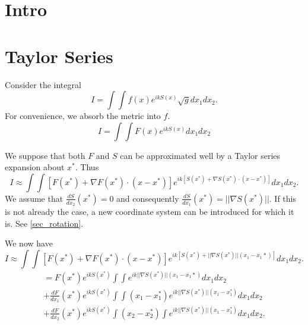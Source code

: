 \documentclass{article}
\newcommand{\norm}[1]{||#1||}
\theoremstyle{plain}
\begin{document}


\section{Intro}\label{sec_intro}



\section{Taylor Series}


Consider the integral
\begin{equation}
	I = \int\int f(x) e^{ikS(x)} \sqrt{g} dx_1dx_2.
\end{equation}
For convenience, we absorb the metric into $f$.
\begin{equation}
	I = \int\int F(x) e^{ikS(x)} dx_1dx_2
\end{equation}



We suppose that both $F$ and $S$ can be approximated well by a Taylor series expansion about $x^*$.
Thus
\begin{equation}
	I \approx \int\int \left[ F(x^*) + \nabla F(x^*) \cdot (x-x^*) \right] e^{ik\left[S(x^*) + \nabla S(x^*)\cdot (x-x^*) \right]} dx_1dx_2.
\end{equation}
We assume that $\frac{dS}{dx_2}(x^*) = 0$ and consequently $\frac{dS}{dx_1}(x^*) = \norm{\nabla S(x^*)}$.
If this is not already the case, a new coordinate system can be introduced for which it is. See \ref{sec_rotation}.


We now have
\begin{equation}
	I \approx \int\int \left[ F(x^*) + \nabla F(x^*) \cdot (x-x^*) \right] e^{ik\left[S(x^*) + \norm{\nabla S(x^*)}(x_1-x_1*) \right]} dx_1dx_2.
\end{equation}
\begin{multline}
	= F(x^*) e^{ikS(x^*)} \int\int e^{ik\norm{\nabla S(x^*)}(x_1-x_1*)} dx_1dx_2 \\
	+ \frac{dF}{dx_1}(x^*) e^{ikS(x^*)} \int\int (x_1-x_1^*) e^{ik\norm{\nabla S(x^*)}(x_1-x_1^*)} dx_1dx_2 \\
	+ \frac{dF}{dx_2}(x^*) e^{ikS(x^*)} \int (x_2-x_2^*) \int e^{ik\norm{\nabla S(x^*)}(x_1-x_1^*)} dx_1dx_2.
\end{multline}
\end{document}

